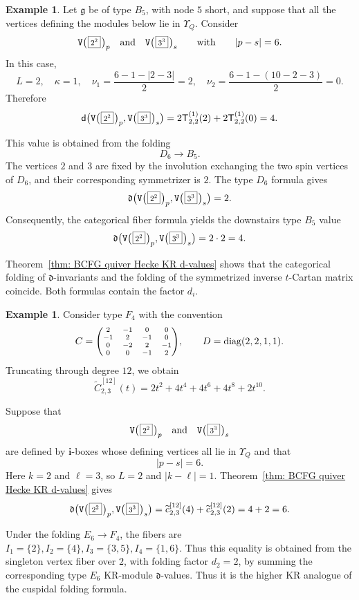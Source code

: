 \documentclass[12pt, leqno]{amsart}
\numberwithin{equation}{section}
\theoremstyle{plain}
\theoremstyle{definition}
\newtheorem{example}[lemma]{Example}
\newcommand{\Vkm}[1]{%
  \ttV\bigl(\hspace{0.2ex}\scalebox{.8}{\(\boxed{#1}\)}\hspace{0.2ex}\bigr)%
}
\newcommand{\g}{\mathfrak{g}}
\newcommand{\de}{\mathfrak{d}}
\newcommand{\tC}{\widetilde{C}}
\newcommand{\tc}{\widetilde{c}}
\newcommand{\sfT}{\mathsf{T}}
\newcommand{\bfi}{\mathbf{i}}
\newcommand{\ttV}{\mathtt{V}}
\newcommand{\diag}{\mathrm{diag}}
\newcommand{\qtq}[1][{and}]{\quad\text{{#1}}\quad}
\begin{document}
\begin{example}\label{ex: type B5 folded KR d-value}
Let \(\g\) be of type \(B_5\), with node \(5\) short, and suppose
that all the vertices defining the modules below lie in
\(\Upsilon_Q\).  Consider
\[
\Vkm{2^2}_p \qtq \Vkm{3^3}_s \qquad\text{with}\qquad |p-s|=6.
\]
In this case,
\[
L=2,\quad \kappa=1, \quad
\nu_1 = \frac{6-1-|2-3|}{2} = 2,
\quad
\nu_2 = \frac{6-1-(10-2-3)}{2} = 0.
\]
Therefore
\[
\begin{aligned}
\de\bigl( \Vkm{2^2}_p, \Vkm{3^3}_s \bigr) = 2\sfT^{(1)}_{2,2}(2) + 2\sfT^{(1)}_{2,2}(0)= 4.
\end{aligned}
\]

This value is obtained from the folding
\[
D_6\longrightarrow B_5.
\]
The vertices \(2\) and \(3\) are fixed by the involution exchanging
the two spin vertices of \(D_6\), and their corresponding
symmetrizer is \(2\).  The type \(D_6\) formula gives
\[
\de\bigl(
\Vkm{2^2}_p,
\Vkm{3^3}_s
\bigr)
=
2.
\]
Consequently, the categorical fiber formula yields the downstairs
type \(B_5\) value
\[
\de\bigl(
\Vkm{2^2}_p,
\Vkm{3^3}_s
\bigr)
=
2\cdot2
=
4.
\]
\end{example}


Theorem~\ref{thm: BCFG quiver Hecke KR d-values} shows that the
categorical folding of \(\de\)-invariants and the folding of the
symmetrized inverse \(t\)-Cartan matrix coincide.   Both formulas contain the factor \(d_i\).  

\begin{example}\label{ex: type F4 folded KR d-value}
Consider type \(F_4\) with the convention
\[
C=
{\scriptsize\begin{pmatrix}
2&-1&0&0\\
-1&2&-1&0\\
0&-2&2&-1\\
0&0&-1&2
\end{pmatrix}},
\qquad
D=\diag(2,2,1,1).
\]
Truncating through degree \(12\), we obtain 
\[
\tC_{2,3}^{[12]}(t)
=
2t^2+4t^4+4t^6+4t^8+2t^{10}.
\]

Suppose that
\[
\Vkm{2^2}_p
\qtq
\Vkm{3^3}_s
\]
are defined by \(\bfi\)-boxes whose defining vertices all lie in
\(\Upsilon_Q\) and that
\[
|p-s|=6.
\] 
Here \(k=2\) and \(\ell=3\), so \(L=2\) and \(|k-\ell|=1\).
Theorem~\ref{thm: BCFG quiver Hecke KR d-values} gives
\[
\begin{aligned}
\de\bigl( \Vkm{2^2}_p, \Vkm{3^3}_s \bigr) = \tc_{2,3}^{[12]}(4) + \tc_{2,3}^{[12]}(2) = 4+2 = 6.
\end{aligned}
\]

Under the folding
$E_6\longrightarrow F_4$,
the fibers are
$I_1=\{2\},I_2=\{4\}, 
I_3=\{3,5\}, I_4=\{1,6\}$.
Thus this equality is obtained from the singleton vertex fiber over
\(2\), with folding factor \(d_2=2\), by summing the corresponding
type \(E_6\) KR-module \(\de\)-values.
Thus it is the higher KR analogue of the cuspidal folding formula.
\end{example}
\end{document}
